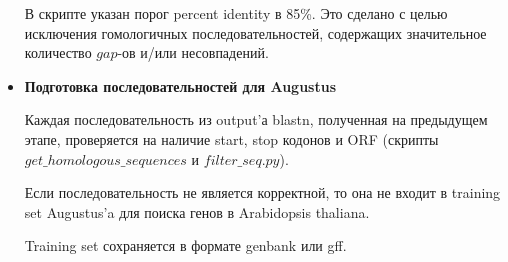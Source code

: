 \documentclass[12pt,a4paper]{article}
\begin{document}
\begin{itemize}
	    В скрипте указан порог percent identity в 85\%. Это сделано с целью исключения гомологичных последовательностей, содержащих значительное количество $gap$-ов и/или несовпадений.
	    
	    \item \bf Подготовка последовательностей для Augustus \normalfont
	    
	    Каждая последовательность из output'а blastn, полученная на предыдущем этапе, 
	    проверяется на наличие start, stop кодонов и ORF (скрипты $get\_homologous\_sequences$ и $filter\_seq.py$).
	    
	    Если последовательность не является корректной, то она не входит в training set Augustus'a для поиска генов в Arabidopsis thaliana.
	    
	    Training set сохраняется в формате genbank или gff.
	
	
	\end{itemize}
\end{document}
